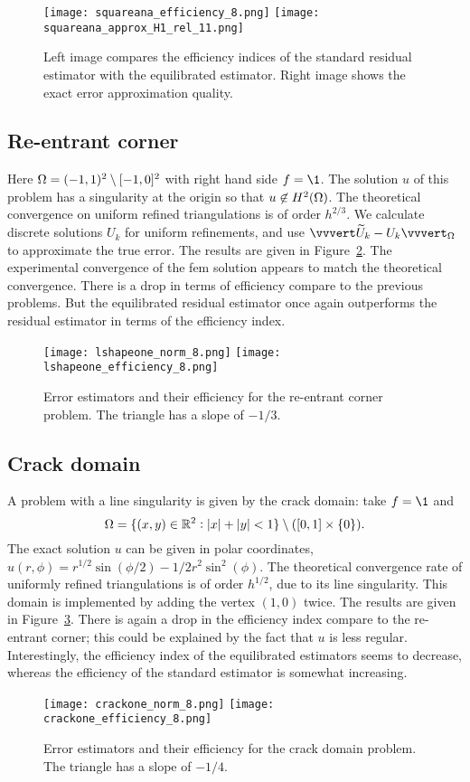 \documentclass[thesis.tex]{subfiles}
\begin{document}
\begin{figure}
  \centering
  \texttt{[image: squareana\_efficiency\_8.png]}
  \texttt{[image: squareana\_approx\_H1\_rel\_11.png]}
  \caption{Left image compares the efficiency indices of the standard residual estimator with the equilibrated estimator. Right image
  shows the exact error approximation quality.}
  \label{fig:squareana}
\end{figure}

\subsection{Re-entrant corner}
Here $\Omega = (-1,1)^2\setminus[-1,0]^2$ with right hand side $f = \1$. The solution $u$ of this problem has a singularity at the origin so
that $u \not \in H^2(\Omega)$. The theoretical
convergence on uniform refined triangulations is of order $h^{2/3}$. We calculate  discrete solutions $U_k$ for uniform refinements, and use $\uaenorm{\wt U_k - U_k}_\O$ to approximate the true error. The results are given in Figure~\ref{fig:lshapeone}. The experimental
convergence of the fem solution appears to match the theoretical convergence. There is a drop
in terms of efficiency compare to the previous problems. But the equilibrated residual
estimator once again outperforms the residual estimator in terms of the efficiency index.

\begin{figure}
  \texttt{[image: lshapeone\_norm\_8.png]}
  \texttt{[image: lshapeone\_efficiency\_8.png]}
  \caption{Error estimators and their efficiency for the re-entrant corner problem. The triangle has a slope of $-1/3$.}
  \label{fig:lshapeone}
\end{figure}

\subsection{Crack domain}
A problem with a line singularity is given by the crack domain: take $f = \1$ and
\[
  \Omega=\{(x,y) \in \mathbb{R}^2 : |x|+|y|<1\}\setminus ([0,1] \times \set{0}).
\]
The exact solution $u$ can be given in polar coordinates, $u(r, \phi) = r^{1/2}\sin(\phi/2) - 1/2 r^2 \sin^2 (\phi)$.
The theoretical convergence rate of uniformly refined triangulations is of order $h^{1/2}$, due to its line singularity. This
domain is implemented by adding the vertex $(1,0)$ twice.  The results are given in Figure~\ref{fig:crackone}.
There is again a drop in the efficiency index compare to the re-entrant corner; this could
be explained by the fact that $u$ is less regular.
Interestingly, the efficiency index of the equilibrated estimators seems to decrease, whereas the efficiency
of the standard estimator is somewhat increasing.
\begin{figure}
  \texttt{[image: crackone\_norm\_8.png]}
  \texttt{[image: crackone\_efficiency\_8.png]}
  \caption{Error estimators and their efficiency for the crack domain problem. The triangle has a slope of $-1/4$.}
  \label{fig:crackone}
\end{figure}
\end{document}
